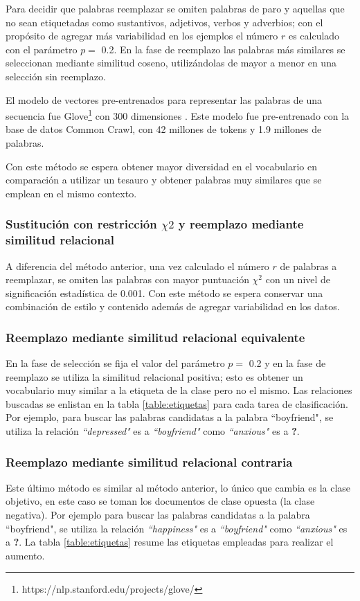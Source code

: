 Para decidir que palabras reemplazar se omiten palabras de paro y aquellas que no sean etiquetadas como sustantivos, adjetivos, verbos y adverbios; con el propósito de agregar más variabilidad en los ejemplos el número $r$ es calculado con el parámetro $p=$ 0.2. En la fase de reemplazo las palabras más similares se seleccionan mediante similitud coseno, utilizándolas de mayor a menor en una selección sin reemplazo.

El modelo de vectores pre-entrenados para representar las palabras de una secuencia fue Glove\footnote{https://nlp.stanford.edu/projects/glove/} con 300 dimensiones \citep{pennington2014glove}. Este modelo fue pre-entrenado con la base de datos Common Crawl, con 42 millones de  tokens y 1.9 millones de palabras. 

Con este método se espera obtener mayor diversidad en el vocabulario en comparación a utilizar un tesauro y obtener palabras muy similares que se emplean en el mismo contexto.

\subsubsection{Sustitución con restricción $\chi2$  y reemplazo mediante similitud relacional}
A diferencia del método anterior, una vez calculado el número $r$ de palabras a reemplazar, se omiten las palabras con mayor puntuación $\chi^2$ con un nivel de significación estadística de 0.001. Con este método se espera conservar una combinación de estilo y contenido además de agregar variabilidad en los datos. 

\subsubsection{Reemplazo mediante similitud relacional equivalente}
En la fase de selección se fija el valor del parámetro $p=$ 0.2 y en la fase de reemplazo se utiliza la similitud relacional positiva; esto es obtener un vocabulario muy similar a la etiqueta de la clase pero no el mismo. Las relaciones buscadas se enlistan en la tabla \ref{table:etiquetas} para cada tarea de clasificación. Por ejemplo, para buscar las palabras candidatas a la palabra ``boyfriend", se utiliza la relación \textit{``depressed"} es a \textit{``boyfriend"} como \textit{``anxious"} es a \textbf{?}. 

\subsubsection{Reemplazo mediante similitud relacional contraria}
Este último método es similar al método anterior, lo único que cambia es la clase objetivo, en este caso se toman los documentos de clase opuesta (la clase negativa). Por ejemplo para buscar las palabras candidatas a la palabra ``boyfriend", se utiliza la relación \textit{``happiness"} es a \textit{``boyfriend"} como \textit{``anxious"} es a \textbf{?}. La tabla \ref{table:etiquetas} resume las etiquetas empleadas para realizar el aumento.

